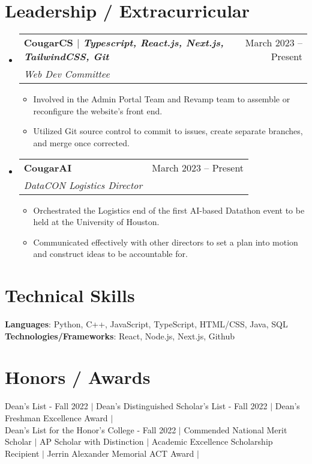 \documentclass[letterpaper,11pt]{article}
\makeatletter
\newcommand{\resumeItem}[1]{
  \item\small{
    {#1 \vspace{-2pt}}
  }
}
\newcommand{\resumeSubheading}[4]{
  \vspace{-2pt}\item
    \begin{tabular*}{0.97\textwidth}[t]{l@{\extracolsep{\fill}}r}
      \textbf{#1} & #2 \\
      \textit{\small#3} & \textit{\small #4} \\
    \end{tabular*}\vspace{-7pt}
}
\newcommand{\resumeSubHeadingListStart}{\begin{itemize}[leftmargin=0.15in, label={}]}
\newcommand{\resumeSubHeadingListEnd}{\end{itemize}}
\newcommand{\resumeItemListStart}{\begin{itemize}}
\newcommand{\resumeItemListEnd}{\end{itemize}\vspace{-5pt}}
\makeatother
\begin{document}
\section{Leadership / Extracurricular}
    \resumeSubHeadingListStart
        \resumeSubheading{CougarCS $|$ \emph{Typescript, React.js, Next.js, TailwindCSS, Git}}{March 2023 -- Present}{Web Dev Committee}{}
            \resumeItemListStart
                \resumeItem{Involved in the Admin Portal Team and Revamp team to assemble or reconfigure the website's front end.}
                \resumeItem{Utilized Git source control to commit to issues, create separate branches, and merge once corrected.}
            \resumeItemListEnd
            \resumeSubheading{CougarAI}{March 2023 -- Present}{DataCON Logistics Director}{}
            \resumeItemListStart
                \resumeItem{Orchestrated the Logistics end of the first AI-based Datathon event to be held at the University of Houston.}
                \resumeItem{Communicated effectively with other directors to set a plan into motion and construct ideas to be accountable for.}
            \resumeItemListEnd
        
    \resumeSubHeadingListEnd


%
\section{Technical Skills}
 \begin{itemize}[leftmargin=0.15in, label={}]
    \small{\item{
     \textbf{Languages}{: Python, C++, JavaScript, TypeScript, HTML/CSS, Java, SQL} \\
     \textbf{Technologies/Frameworks}{: React, Node.js, Next.js, Github}
    }}
 \end{itemize}

 \section{Honors / Awards}
 \begin{itemize}[leftmargin=0.15in, label={}]
    \small{\item{
     \textbf{}{Dean’s List - Fall 2022 $|$ Dean’s Distinguished Scholar’s List - Fall 2022 $|$ Dean’s Freshman Excellence Award $|$ \\Dean’s List for  the Honor’s College - Fall 2022 $|$ Commended National Merit Scholar $|$ AP Scholar with Distinction $|$ Academic Excellence Scholarship Recipient $|$ Jerrin Alexander Memorial ACT Award $|$}{} \\
    }}
 \end{itemize}


\end{document}
